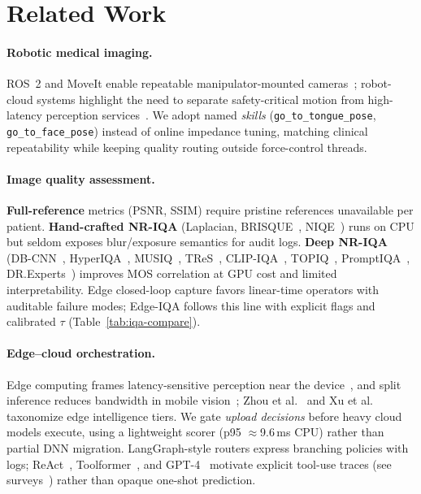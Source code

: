 \section{Related Work}
\label{sec:related}

\paragraph{Robotic medical imaging.}
ROS~2 and MoveIt enable repeatable manipulator-mounted cameras~\cite{moore2021ros2,chitta2009moveit}; robot-cloud systems highlight the need to separate safety-critical motion from high-latency perception services~\cite{liu2019robotcloud}.
We adopt named \emph{skills} (\texttt{go\_to\_tongue\_pose}, \texttt{go\_to\_face\_pose}) instead of online impedance tuning, matching clinical repeatability while keeping quality routing outside force-control threads.

\paragraph{Image quality assessment.}
\textbf{Full-reference} metrics (PSNR, SSIM) require pristine references unavailable per patient.
\textbf{Hand-crafted NR-IQA} (Laplacian, BRISQUE~\cite{mittal2012brisque}, NIQE~\cite{mittal2012niqe}) runs on CPU but seldom exposes blur/exposure semantics for audit logs.
\textbf{Deep NR-IQA} (DB-CNN~\cite{zhang2018blind}, HyperIQA~\cite{su2020hyperiqa}, MUSIQ~\cite{ke2021musiq}, TReS~\cite{golestaneh2022tres}, CLIP-IQA~\cite{wang2023clipiqa}, TOPIQ~\cite{chen2024topiq}, PromptIQA~\cite{chen2024promptiqa}, DR.Experts~\cite{fu2026dr.experts}) improves MOS correlation at GPU cost and limited interpretability.
Edge closed-loop capture favors linear-time operators with auditable failure modes; Edge-IQA follows this line with explicit flags and calibrated $\tau$ (Table~\ref{tab:iqa-compare}).

\paragraph{Edge--cloud orchestration.}
Edge computing frames latency-sensitive perception near the device~\cite{wang2014edge}, and split inference reduces bandwidth in mobile vision~\cite{kang2017neurosurgeon,li2018edge,zhou2019edge}; Zhou et al.~\cite{zhou2019edge} and Xu et al.~\cite{xu2021a} taxonomize edge intelligence tiers.
We gate \emph{upload decisions} before heavy cloud models execute, using a lightweight scorer (p95 $\approx$9.6\,ms CPU) rather than partial DNN migration.
LangGraph-style routers express branching policies with logs; ReAct~\cite{yao2023react}, Toolformer~\cite{schick2023toolformer}, and GPT-4~\cite{openai2023gpt-4} motivate explicit tool-use traces (see surveys~\cite{wang2024a}) rather than opaque one-shot prediction.

